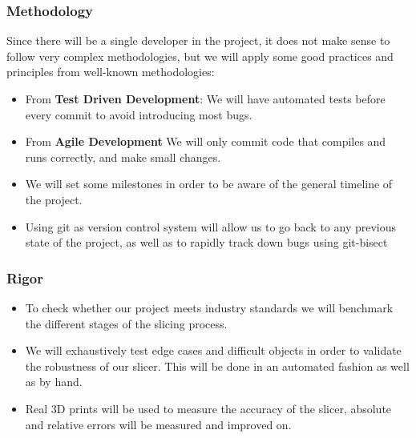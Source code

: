 \subsubsection{Methodology}
Since there will be a single developer in the project, it does not make sense to follow very complex methodologies, but we will apply some good practices and principles from well-known methodologies:
\begin{itemize}
    \item From \textbf{Test Driven Development}: We will have automated tests before every commit to avoid introducing most bugs.
    \item From \textbf{Agile Development} We will only commit code that compiles and runs correctly, and make small changes.
    \item We will set some milestones in order to be aware of the general timeline of the project.
    \item Using git as version control system will allow us to go back to any previous state of the project, as well as to rapidly track down bugs using git-bisect \cite{git-bisect}
\end{itemize}

\subsubsection{Rigor}
\begin{itemize}
    \item To check whether our project meets industry standards we will benchmark the different stages of the slicing process.
    \item We will exhaustively test edge cases and difficult objects in order to validate the robustness of our slicer. This will be done in an automated fashion as well as by hand.
    \item Real 3D prints will be used to measure the accuracy of the slicer, absolute and relative errors will be measured and improved on.
\end{itemize}


